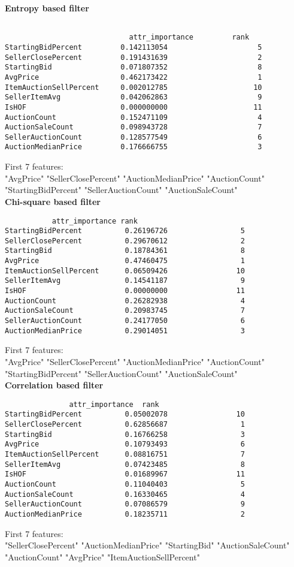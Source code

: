 \documentclass{article}
\begin{document}
\textbf{Entropy based filter}
\begin{verbatim}

                    		 attr_importance 		 rank
StartingBidPercent         0.142113054                     5
SellerClosePercent         0.191431639                     2
StartingBid                0.071807352                     8
AvgPrice                   0.462173422                     1
ItemAuctionSellPercent     0.002012785                    10
SellerItemAvg              0.042062863                     9
IsHOF                      0.000000000                    11
AuctionCount               0.152471109                     4
AuctionSaleCount           0.098943728                     7
SellerAuctionCount         0.128577549                     6
AuctionMedianPrice         0.176666755                     3
\end{verbatim}

First 7 features:\\
"AvgPrice"           "SellerClosePercent" "AuctionMedianPrice" "AuctionCount"      "StartingBidPercent" "SellerAuctionCount" "AuctionSaleCount"  
\\

\textbf{Chi-square based filter}
\begin{verbatim}
           attr_importance rank
StartingBidPercent          0.26196726                 5
SellerClosePercent          0.29670612                 2
StartingBid                 0.18784361                 8
AvgPrice                    0.47460475                 1
ItemAuctionSellPercent      0.06509426                10
SellerItemAvg               0.14541187                 9
IsHOF                       0.00000000                11
AuctionCount                0.26282938                 4
AuctionSaleCount            0.20983745                 7
SellerAuctionCount          0.24177050                 6
AuctionMedianPrice          0.29014051                 3
\end{verbatim}

First 7 features:\\
"AvgPrice"           "SellerClosePercent" "AuctionMedianPrice" "AuctionCount"      "StartingBidPercent" "SellerAuctionCount" "AuctionSaleCount"   
\\

\textbf{Correlation based filter}
\begin{verbatim}
               attr_importance 	rank
StartingBidPercent          0.05002078                10
SellerClosePercent          0.62856687                 1
StartingBid                 0.16766258                 3
AvgPrice                    0.10793493                 6
ItemAuctionSellPercent      0.08816751                 7
SellerItemAvg               0.07423485                 8
IsHOF                       0.01689967                11
AuctionCount                0.11040403                 5
AuctionSaleCount            0.16330465                 4
SellerAuctionCount          0.07086579                 9
AuctionMedianPrice          0.18235711                 2
\end{verbatim}

First 7 features:\\
"SellerClosePercent"     "AuctionMedianPrice"     "StartingBid" "AuctionSaleCount"       "AuctionCount"           "AvgPrice"   "ItemAuctionSellPercent"  
\\
\end{document}

